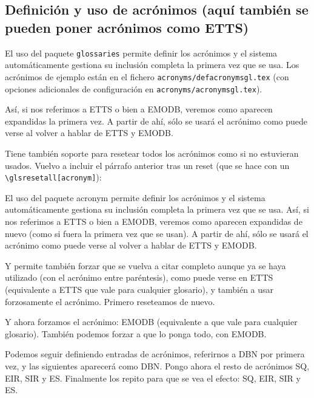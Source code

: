 \documentclass[spanish,openright]{book}
\begin{document}
\subsection{Definición y uso de acrónimos (aquí también
se pueden poner acrónimos como \acs{ETTS})}
\label{sec:uso-de-acronimos}

El uso del paquete \texttt{glossaries} permite definir los acrónimos y
el sistema automáticamente gestiona su inclusión completa la primera vez
que se usa. Los acrónimos de ejemplo están en el fichero
\texttt{acronyms/defacronymsgl.tex} (con opciones adicionales de
configuración en \texttt{acronyms/acronymsgl.tex}).

Así, si nos referimos a \ac{ETTS} o bien a \ac{EMODB},
veremos como aparecen expandidas la primera vez. A partir de ahí, sólo
se usará el acrónimo como puede verse al volver a hablar de \ac{ETTS} y
\ac{EMODB}.

Tiene también soporte para resetear todos los acrónimos como si no
estuvieran usados. Vuelvo a incluir el párrafo anterior tras un reset
(que se hace con un \texttt{\textbackslash{}glsresetall[acronym]}):

\glsresetall[acronym]

El uso del paquete acronym permite definir los acrónimos y el sistema
automáticamente gestiona su inclusión completa la primera vez que se
usa. Así, si nos referimos a \ac{ETTS} o bien a \ac{EMODB}, veremos como
aparecen expandidas de nuevo (como si fuera la primera vez que se
usan). A partir de ahí, sólo se usará el acrónimo como puede verse al
volver a hablar de \ac{ETTS} y \ac{EMODB}.

Y permite también forzar que se vuelva a citar completo aunque ya se
haya utilizado (con el acrónimo entre paréntesis), como puede verse en
\acl{ETTS} (equivalente a \glsdesc{ETTS} que vale para cualquier
glosario), y también a usar forzosamente el acrónimo. Primero reseteamos
de nuevo.

\glsresetall[acronym]

Y ahora forzamos el acrónimo: \acs{EMODB} (equivalente a
 que vale para cualquier glosario). También podemos
forzar a que lo ponga todo, con \acf{EMODB}.


Podemos seguir definiendo entradas de acrónimos, referirnos a \ac{DBN}
por primera vez, y las siguientes aparecerá como \ac{DBN}.  Pongo ahora
el resto de acrónimos \ac{SQ}, \ac{EIR}, \ac{SIR} y
\ac{ES}. Finalmente los repito para que se vea el efecto: \ac{SQ},
\ac{EIR}, \ac{SIR} y \ac{ES}.
\end{document}
